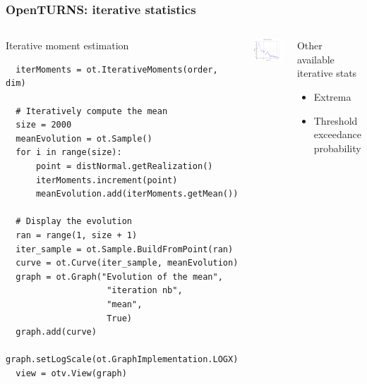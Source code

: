 \documentclass{beamer}
\begin{document}
\begin{frame}[containsverbatim]
  \frametitle{OpenTURNS: iterative statistics   }
\small
\begin{columns}



  \begin{block}{Iterative moment estimation}
  \begin{lstlisting}
  iterMoments = ot.IterativeMoments(order, dim)

  # Iteratively compute the mean
  size = 2000
  meanEvolution = ot.Sample()
  for i in range(size):
      point = distNormal.getRealization()
      iterMoments.increment(point)
      meanEvolution.add(iterMoments.getMean())

  # Display the evolution
  ran = range(1, size + 1)
  iter_sample = ot.Sample.BuildFromPoint(ran)
  curve = ot.Curve(iter_sample, meanEvolution)
  graph = ot.Graph("Evolution of the mean",
                    "iteration nb",
                    "mean",
                    True)
  graph.add(curve)
  graph.setLogScale(ot.GraphImplementation.LOGX)
  view = otv.View(graph)
  \end{lstlisting}
  \end{block}


  \includegraphics[width=\textwidth]{figures/iter_mean.png}

  \begin{block}{Other available iterative stats}
    \begin{itemize}
      \item Extrema
      \item Threshold exceedance probability
    \end{itemize}
  \end{block}

\end{columns}

\end{frame}
\end{document}

